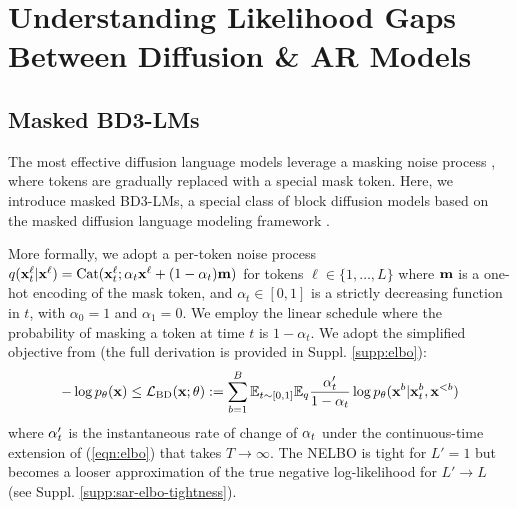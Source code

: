 \documentclass{article} %
\def\algofull{Block Discrete Denoising Diffusion Language Models}
\def\algos{BD3-LMs}
\begin{document}



\section{Understanding Likelihood Gaps Between Diffusion \& AR Models}

\subsection{Masked \algos{}}

The most effective diffusion language models leverage a masking noise process \citep{austin2021structured,lou2024discrete,sahoo2024simple}, where tokens are gradually replaced with a special mask token. Here, we introduce masked \algos{}, a special class of block diffusion models based on the masked diffusion language modeling framework \citep{sahoo2024simple, shi2024simplified, ou2025your}.

More formally, we adopt a per-token noise process $q({\mathbf x}^\ell_t| {\mathbf x}^\ell) = \text{Cat}({\mathbf x}^\ell_t; \alpha_{t} {\mathbf x}^\ell + (1 - \alpha_{t}) {\mathbf m})$ for tokens $\ell \in \{1, \dots, L\}$
where ${\mathbf m}$ is a one-hot encoding of the mask token, and $\alpha_t \in [0, 1]$
is a strictly decreasing function in $t$, with $\alpha_{0} = 1$ and $\alpha_{1} = 0$. We employ the linear schedule where the probability of masking a token at time $t$ is $1-\alpha_t$.
We adopt the simplified objective from \cite{sahoo2024simple, shi2024simplified, ou2025your} (the full derivation is provided in Suppl. \ref{supp:elbo}):
\begin{align}\label{eqn:sar-elbo-exp}
    - \log p_\theta({\mathbf x}) \leq \mathcal{L}_\text{BD}({\mathbf x}; \theta) :=  \sum_{b=1}^{B} \mathbb{E}_{t \sim [0, 1]} \mathbb{E}_{q} \frac{\alpha_{t}'}{1-\alpha_{t}} \log p_\theta({\mathbf x}^b | {\mathbf x}_{t}^b, {\mathbf x}^{<b})
\end{align}
\noindent where $\alpha_{t}'$ is the instantaneous rate of change of $\alpha_{t}$ under the continuous-time extension of (\ref{eqn:elbo}) that takes $T \rightarrow \infty$. The NELBO is tight for $L'=1$ but becomes a looser approximation of the true negative log-likelihood for $L' \rightarrow L$  (see Suppl. \ref{supp:sar-elbo-tightness}).
\end{document}
